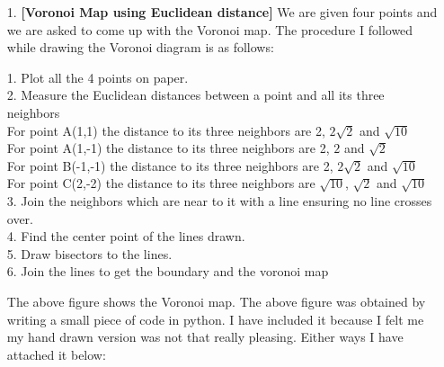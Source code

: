 \documentclass[11pt]{article}
\begin{document}
\begin{enumerate}
	\item[1.] \textbf{[Voronoi Map using Euclidean distance]}
	 We are given four points and  we are asked to come up with the Voronoi map. The procedure I followed while drawing the Voronoi diagram is as follows:
	 
	 1. Plot all the 4 points on paper.\\
	 2. Measure the Euclidean distances between a point and all its three neighbors \\
	 
	 For point A(1,1) the distance to its three neighbors are 2, $2\sqrt{2}$ and $\sqrt{10}$\\
	 For point A(1,-1) the distance to its three neighbors are 2, $2$ and $\sqrt{2}$\\
	 For point B(-1,-1) the distance to its three neighbors are 2, $2\sqrt{2}$ and $\sqrt{10}$\\
	 For point C(2,-2) the distance to its three neighbors are $\sqrt{10}$, $\sqrt{2}$ and $\sqrt{10}$\\
	  
	3. Join the neighbors which are near to it with a line ensuring no line crosses over.\\
	4. Find the center point of the lines drawn. \\
	5. Draw bisectors to the lines. \\
	6. Join the lines to get the boundary and the voronoi map \\
	
	\begin{figure}[H]%
		\centering
	\end{figure}	

The above figure shows the Voronoi map. The above figure was obtained by writing a small piece of code in python. I have included it because I felt me my hand drawn version was not that really pleasing. Either ways I have attached it below:


\end{enumerate}
\end{document}
